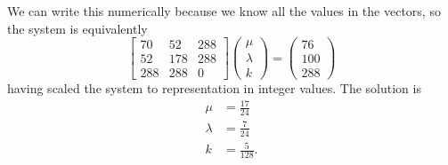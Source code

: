 We can write this numerically because we know all the values in the vectors, so the system is equivalently
\begin{equation*}
    \begin{bmatrix}
        70 & 52 & 288 \\
        52 & 178 & 288 \\
        288 & 288 & 0
    \end{bmatrix} \begin{pmatrix}
        \mu \\
        \lambda \\
        k
    \end{pmatrix} = \begin{pmatrix}
        76 \\
        100 \\
        288
    \end{pmatrix}
\end{equation*}
having scaled the system to representation in integer values.
The solution is
\begin{align*}
    \mu &= \frac{17}{24} \\
    \lambda &= \frac{7}{24} \\
    k &= \frac{5}{128}.
\end{align*}

